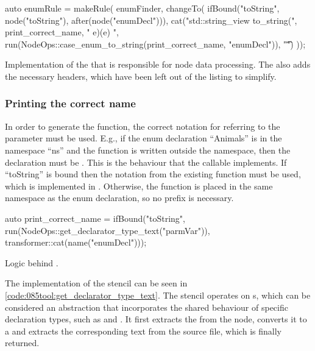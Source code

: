 \begin{listing}[H]
    \begin{cppcode}
auto enumRule = makeRule(
    enumFinder,
    changeTo(
        ifBound("toString", node("toString"), after(node("enumDecl"))),
        cat("\n\nconstexpr std::string_view to_string(",
            print_correct_name,
            " e){\n\tswitch(e) {\n",
            run(NodeOps::case_enum_to_string(print_correct_name, "enumDecl")),
            "\t}\n}")
    ));
    \end{cppcode}
    \caption{Implementation of the  that is responsible for node data processing. The  also adds the necessary headers, which have been left out of the listing to simplify.}
    \label{code:085tool:enum_rule}
\end{listing}

\subsubsection*{Printing the correct name}
In order to generate the  function, the correct notation for referring to the parameter must be used. E.g., if the enum declaration ``Animals'' is in the namespace ``ns'' and the  function is written outside the namespace, then the declaration must be .
This is the behaviour that the callable  implements.
If ``toString'' is bound then the notation from the existing  function must be used, which is implemented in  
.
Otherwise, the  function is placed in the same namespace as the enum declaration, so no prefix is necessary.

\begin{listing}[H]
    \begin{cppcode}
auto print_correct_name = ifBound("toString",
    run(NodeOps::get_declarator_type_text("parmVar")),
    transformer::cat(name("enumDecl")));
    \end{cppcode}
    \caption{Logic behind .}
    \label{code:085tool:print_correct_name}
\end{listing}

The implementation of the stencil  can be seen in \cref{code:085tool:get_declarator_type_text}.
The stencil operates on s, which can be considered an abstraction that incorporates the shared behaviour of specific declaration types, such as  and .
It first extracts the  from the node, converts it to a  and extracts the corresponding text from the source file, which is finally returned.

